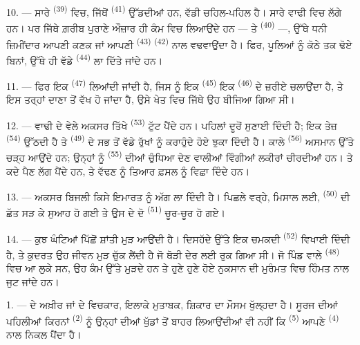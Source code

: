 10. --- ਸਾਰੇ  \textsuperscript{(39)} ਵਿਚ, ਜਿੱਥੋਂ 
\textsuperscript{(41)} ਉੱਡਦੀਆਂ ਹਨ, ਵੱਡੀ ਚਹਿਲ-ਪਹਿਲ ਹੈ। ਸਾਰੇ ਵਾਢੀ ਵਿਚ ਲੱਗੇ ਹਨ। ਪਰ
ਜਿੱਥੇ ਗ਼ਰੀਬ ਪੁਰਾਣੇ ਔਜ਼ਾਰ ਹੀ ਕੰਮ ਵਿਚ ਲਿਆਉਂਦੇ ਹਨ —  ਤੇ
 \textsuperscript{(40)} —, ਉੱਥੇ ਧਨੀ ਜ਼ਿਮੀਂਦਾਰ ਆਪਣੀ ਕਣਕ ਜਾਂ ਆਪਣੀ
 \textsuperscript{(43)}  \textsuperscript{(42)} ਨਾਲ
ਵਢਵਾਉਂਦਾ ਹੈ। ਫਿਰ, ਪੂਲਿਆਂ ਨੂੰ ਕੋਠੇ ਤਕ ਢੋਏ ਬਿਨਾਂ, ਉੱਥੇ ਹੀ ਵੱਡੇ 
\textsuperscript{(44)} ਲਾ ਦਿੱਤੇ ਜਾਂਦੇ ਹਨ।

11. --- ਫਿਰ ਇਕ  \textsuperscript{(47)} ਲਿਆਂਦੀ ਜਾਂਦੀ ਹੈ,
ਜਿਸ ਨੂੰ ਇਕ  \textsuperscript{(45)} ਇਕ 
\textsuperscript{(46)} ਦੇ ਜ਼ਰੀਏ ਚਲਾਉਂਦਾ ਹੈ, ਤੇ ਇਸ ਤਰ੍ਹਾਂ ਦਾਣਾ  ਤੋਂ
ਵੱਖ ਹੋ ਜਾਂਦਾ ਹੈ, ਉਸੇ ਖੇਤ ਵਿਚ ਜਿੱਥੇ ਉਹ ਬੀਜਿਆ ਗਿਆ ਸੀ।

\VUsaut{5.0mm}
\VUsaut{3.4mm}

12. --- ਵਾਢੀ ਦੇ ਵੇਲੇ ਅਕਸਰ ਤਿੱਖੇ  \textsuperscript{(53)} ਟੁੱਟ ਪੈਂਦੇ
ਹਨ। ਪਹਿਲਾਂ ਦੂਰੋਂ  ਸੁਣਾਈ ਦਿੰਦੀ ਹੈ; ਇਕ ਤੇਜ਼
 \textsuperscript{(54)} ਉੱਠਦੀ ਹੈ ਤੇ 
\textsuperscript{(49)} ਦੇ ਸਭ ਤੋਂ ਵੱਡੇ ਰੁੱਖਾਂ ਨੂੰ ਕਰਾਹੁੰਦੇ ਹੋਏ ਝੁਕਾ ਦਿੰਦੀ ਹੈ। ਕਾਲੇ
 \textsuperscript{(56)} ਅਸਮਾਨ ਉੱਤੇ ਚੜ੍ਹ ਆਉਂਦੇ ਹਨ; ਉਨ੍ਹਾਂ ਨੂੰ
 \textsuperscript{(55)} ਦੀਆਂ ਚੁੰਧਿਆ ਦੇਣ ਵਾਲੀਆਂ ਵਿੰਗੀਆਂ ਲਕੀਰਾਂ ਚੀਰਦੀਆਂ
ਹਨ।  ਤੇ ਕਦੇ  ਪੈਣ ਲੱਗ ਪੈਂਦੇ ਹਨ, ਤੇ ਵੱਢਣ ਨੂੰ ਤਿਆਰ ਫ਼ਸਲ
ਨੂੰ ਵਿਛਾ ਦਿੰਦੇ ਹਨ।

13. --- ਅਕਸਰ ਬਿਜਲੀ ਕਿਸੇ ਇਮਾਰਤ ਨੂੰ ਅੱਗ ਲਾ ਦਿੰਦੀ ਹੈ। ਪਿਛਲੇ ਵਰ੍ਹੇ, ਮਿਸਾਲ ਲਈ,
 \textsuperscript{(50)} ਦੀ ਛੱਤ ਸੜ ਕੇ ਸੁਆਹ ਹੋ ਗਈ ਤੇ ਉਸ ਦੇ ਦੋ
 \textsuperscript{(51)} ਚੂਰ-ਚੂਰ ਹੋ ਗਏ।

14. --- ਕੁਝ ਘੰਟਿਆਂ ਪਿੱਛੋਂ ਸ਼ਾਂਤੀ ਮੁੜ ਆਉਂਦੀ ਹੈ। ਦਿਸਹੱਦੇ ਉੱਤੇ ਇਕ ਚਮਕਦੀ
 \textsuperscript{(52)} ਵਿਖਾਈ ਦਿੰਦੀ ਹੈ, ਤੇ ਕੁਦਰਤ ਉਹ ਜੀਵਨ ਮੁੜ ਚੁੱਕ
ਲੈਂਦੀ ਹੈ ਜੋ ਥੋੜੀ ਦੇਰ ਲਈ ਰੁਕ ਗਿਆ ਸੀ। ਜੋ ਪਿੰਡ ਵਾਲੇ 
\textsuperscript{(48)} ਵਿਚ ਆ ਲੁਕੇ ਸਨ, ਉਹ ਕੰਮ ਉੱਤੇ ਮੁੜਦੇ ਹਨ ਤੇ ਹੁਣੇ ਹੁਣੇ ਹੋਏ ਨੁਕਸਾਨ
ਦੀ ਮੁਰੰਮਤ ਵਿਚ ਹਿੰਮਤ ਨਾਲ ਜੁਟ ਜਾਂਦੇ ਹਨ।

\VUsaut{6.0mm}
\VUsaut{3.6mm}

\VUsaut{1.4mm}
\VUsaut{4.0mm}

1. ---  ਦੇ ਅਖ਼ੀਰ ਜਾਂ  ਦੇ ਵਿਚਕਾਰ, ਇਲਾਕੇ ਮੁਤਾਬਕ, ਸ਼ਿਕਾਰ
ਦਾ ਮੌਸਮ ਖੁੱਲ੍ਹਦਾ ਹੈ। ਸੂਰਜ ਦੀਆਂ ਪਹਿਲੀਆਂ ਕਿਰਨਾਂ 
\textsuperscript{(2)} ਨੂੰ ਉਨ੍ਹਾਂ ਦੀਆਂ ਖੁੱਡਾਂ ਤੋਂ ਬਾਹਰ ਲਿਆਉਂਦੀਆਂ ਵੀ ਨਹੀਂ ਕਿ
 \textsuperscript{(5)} ਆਪਣੇ  \textsuperscript{(4)}
ਨਾਲ ਨਿਕਲ ਪੈਂਦਾ ਹੈ।

